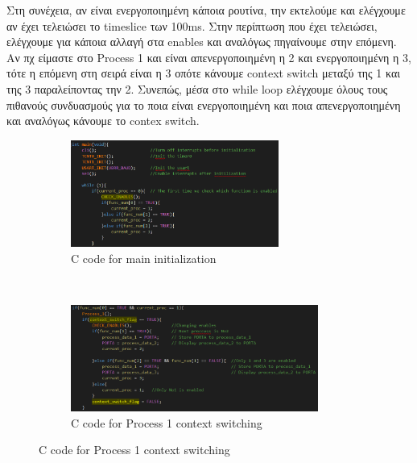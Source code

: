 \documentclass{article}
\begin{document}
	\noindent
	Στη συνέχεια, αν είναι ενεργοποιημένη κάποια ρουτίνα, την εκτελούμε και ελέγχουμε αν έχει τελειώσει το timeslice των 100ms. Στην περίπτωση που έχει τελειώσει, ελέγχουμε για κάποια αλλαγή στα enables και αναλόγως πηγαίνουμε στην επόμενη. Αν πχ είμαστε στο Process 1 και είναι απενεργοποιημένη η 2 και ενεργοποιημένη η 3, τότε η επόμενη στη σειρά είναι η 3 οπότε κάνουμε context switch μεταξύ της 1 και της 3 παραλείποντας την 2. Συνεπώς, μέσα στο while loop ελέγχουμε όλους τους πιθανούς συνδυασμούς για το ποια είναι ενεργοποιημένη και ποια απενεργοποιημένη και αναλόγως κάνουμε το contex switch.
	
	\begin{figure}[h!]
		\centering
		\begin{subfigure}[t]{0.5\textwidth}
			\centering
			\includegraphics[height=3.5cm, width=\linewidth]{./results/lab8_main_init.png}
			\caption{C code for main initialization}
		\end{subfigure}%
		~
		\begin{subfigure}[t]{0.5\textwidth}
			\centering
			\includegraphics[height=3.5cm, width=\linewidth]{./results/lab8_main_proc_1.png}
			\caption{C code for Process 1 context switching}
		\end{subfigure}
	

\end{figure}
\end{document}
